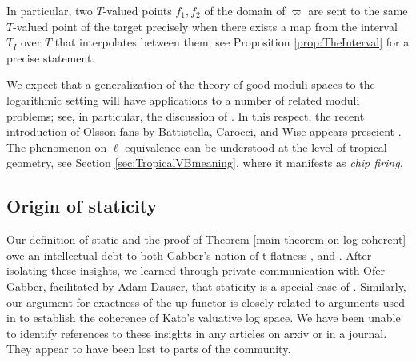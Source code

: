 \documentclass[11pt]{amsart}
\newcommand{\MScomment}[1]{\textcolor{OliveGreen}{[MS: #1]}}
\theoremstyle{definition}
\theoremstyle{definition}
\begin{document}
In particular, two $T$-valued points $f_1,f_2$ of the domain of $\varpi$ are sent to the same $T$-valued point of the target precisely when there exists a map from the interval $T_I$ over $T$ that interpolates between them; see Proposition \ref{prop:TheInterval} for a precise statement. 

We expect that a generalization of the theory of good moduli spaces to the logarithmic setting will have applications to a number of related moduli problems; see, in particular, the discussion of \cite[Section 0.4]{Log-generalized-Kummer}. In this respect, the recent introduction of Olsson fans by Battistella, Carocci, and Wise appears prescient \cite{VBOlssonFan}. The phenomenon on $\ell$-equivalence can be understood at the level of tropical geometry, see Section \ref{sec:TropicalVBmeaning}, where it manifests as \textit{chip firing}.



\subsection{Origin of staticity}\label{sec:origin Static}
 Our definition of static and the proof of Theorem \ref{main theorem on log coherent} owe an intellectual debt to both Gabber's notion of t-flatness \cite[Definition~6.1.35]{gabber2018foundationsringtheory}, and \cite[Lemma~6.5]{kerz2018algebraic}. After isolating these insights, we learned through private communication with Ofer Gabber, facilitated by Adam Dauser, that staticity is a special case of \cite[Definition 2.1.2]{on-toric-log-schemes}. Similarly, our argument for exactness of the up functor is closely related to arguments used in \cite{GabberToricFlattening,on-toric-log-schemes} to establish the coherence of Kato's valuative log space.
We have been unable to identify references to these insights in any articles on arxiv or in a journal. They appear to have been lost to parts of the community. 
\end{document}
